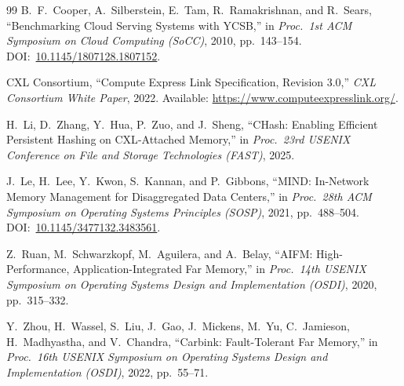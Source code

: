\documentclass[conference]{IEEEtran}
\begin{document}
\begin{thebibliography}{99}
B.~F.~Cooper, A.~Silberstein, E.~Tam, R.~Ramakrishnan, and R.~Sears,
``Benchmarking Cloud Serving Systems with {YCSB},''
in \emph{Proc.\ 1st ACM Symposium on Cloud Computing (SoCC)}, 2010,
  pp.~143--154.
DOI:~\href{https://doi.org/10.1145/1807128.1807152}{10.1145/1807128.1807152}.

{CXL Consortium},
``Compute Express Link Specification, Revision 3.0,''
\emph{CXL Consortium White Paper}, 2022.
Available: \url{https://www.computeexpresslink.org/}.

H.~Li, D.~Zhang, Y.~Hua, P.~Zuo, and J.~Sheng,
``{CHash}: Enabling Efficient Persistent Hashing on {CXL}-Attached Memory,''
in \emph{Proc.\ 23rd USENIX Conference on File and Storage Technologies
  (FAST)}, 2025.

J.~Le, H.~Lee, Y.~Kwon, S.~Kannan, and P.~Gibbons,
``{MIND}: In-Network Memory Management for Disaggregated Data Centers,''
in \emph{Proc.\ 28th ACM Symposium on Operating Systems Principles (SOSP)},
  2021, pp.~488--504.
DOI:~\href{https://doi.org/10.1145/3477132.3483561}{10.1145/3477132.3483561}.

Z.~Ruan, M.~Schwarzkopf, M.~Aguilera, and A.~Belay,
``{AIFM}: High-Performance, Application-Integrated Far Memory,''
in \emph{Proc.\ 14th USENIX Symposium on Operating Systems Design and
  Implementation (OSDI)}, 2020, pp.~315--332.

Y.~Zhou, H.~Wassel, S.~Liu, J.~Gao, J.~Mickens, M.~Yu, C.~Jamieson,
  H.~Madhyastha, and V.~Chandra,
``Carbink: Fault-Tolerant Far Memory,''
in \emph{Proc.\ 16th USENIX Symposium on Operating Systems Design and
  Implementation (OSDI)}, 2022, pp.~55--71.

\end{thebibliography}

\end{document}
